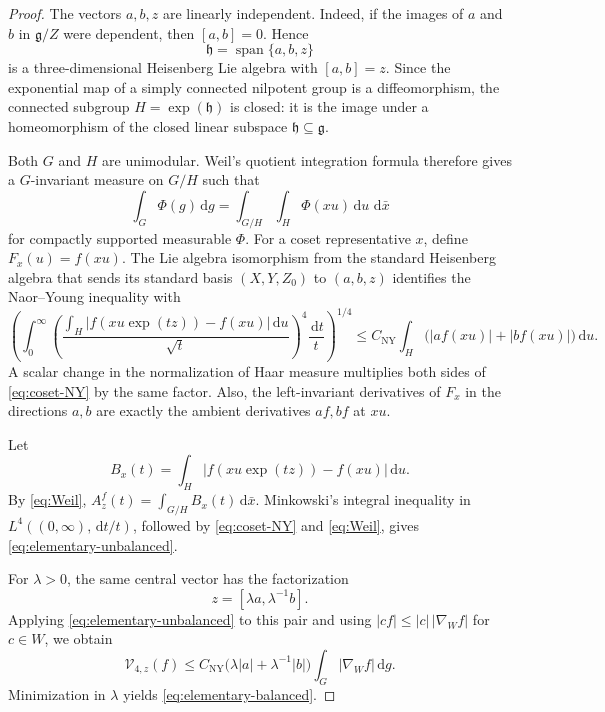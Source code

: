 \documentclass[11pt]{article}
\theoremstyle{remark}
\newcommand{\g}{\mathfrak g}
\newcommand{\h}{\mathfrak h}
\newcommand{\dd}{\,\mathrm d}
\newcommand{\abs}[1]{\lvert #1\rvert}
\begin{document}
\begin{proof}
The vectors \(a,b,z\) are linearly independent.  Indeed, if the images of \(a\) and
\(b\) in \(\g/Z\) were dependent, then \([a,b]=0\).  Hence
\[
 \h=\operatorname{span}\{a,b,z\}
\]
is a three-dimensional Heisenberg Lie algebra with \([a,b]=z\).  Since the exponential
map of a simply connected nilpotent group is a diffeomorphism, the connected subgroup
\(H=\exp(\h)\) is closed: it is the image under a homeomorphism of the closed linear
subspace \(\h\subseteq\g\).

Both \(G\) and \(H\) are unimodular.  Weil's quotient integration formula therefore
gives a \(G\)-invariant measure on \(G/H\) such that
\begin{equation}\label{eq:Weil}
 \int_G\Phi(g)\dd g
 =\int_{G/H}\int_H\Phi(xu)\dd u\,\dd\bar x
\end{equation}
for compactly supported measurable \(\Phi\).  For a coset representative \(x\), define
\(F_x(u)=f(xu)\).  The Lie algebra isomorphism from the standard Heisenberg algebra
that sends its standard basis \((X,Y,Z_0)\) to \((a,b,z)\) identifies the Naor--Young
inequality with
\begin{equation}\label{eq:coset-NY}
 \left(\int_0^\infty
 \left(\frac{\displaystyle\int_H
 \abs{f(xu\exp(tz))-f(xu)}\dd u}{\sqrt t}\right)^4
 \frac{\dd t}{t}\right)^{1/4}
 \le C_{\mathrm{NY}}
 \int_H\bigl(\abs{af(xu)}+\abs{bf(xu)}\bigr)\dd u.
\end{equation}
A scalar change in the normalization of Haar measure multiplies both sides of
\eqref{eq:coset-NY} by the same factor.  Also, the left-invariant derivatives of
\(F_x\) in the directions \(a,b\) are exactly the ambient derivatives \(af,bf\) at
\(xu\).

Let
\[
 B_x(t)=\int_H\abs{f(xu\exp(tz))-f(xu)}\dd u.
\]
By \eqref{eq:Weil}, \(A_z^f(t)=\int_{G/H}B_x(t)\dd\bar x\).  Minkowski's integral
inequality in \(L^4((0,\infty),\dd t/t)\), followed by \eqref{eq:coset-NY} and
\eqref{eq:Weil}, gives \eqref{eq:elementary-unbalanced}.

For \(\lambda>0\), the same central vector has the factorization
\[
 z=[\lambda a,\lambda^{-1}b].
\]
Applying \eqref{eq:elementary-unbalanced} to this pair and using
\(\abs{cf}\le\abs c\,\abs{\nabla_W f}\) for \(c\in W\), we obtain
\[
 \mathcal V_{4,z}(f)
 \le C_{\mathrm{NY}}
 \bigl(\lambda\abs a+\lambda^{-1}\abs b\bigr)
 \int_G\abs{\nabla_Wf}\dd g.
\]
Minimization in \(\lambda\) yields \eqref{eq:elementary-balanced}.
\end{proof}
\end{document}
